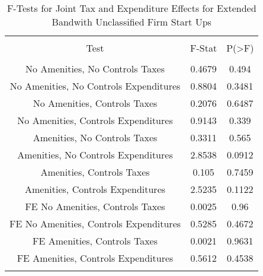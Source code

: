 
\begin{table}[!htbp] \centering 
  \caption{F-Tests for Joint Tax and Expenditure Effects for Extended Bandwith Unclassified Firm Start Ups} 
  \label{99Ftests} 
\begin{tabular}{@{\extracolsep{5pt}} ccc} 
\\[-1.8ex]\hline 
\hline \\[-1.8ex] 
Test & F-Stat & P(\textgreater F) \\ 
\hline \\[-1.8ex] 
No Amenities, No Controls Taxes & 0.4679 & 0.494 \\ 
No Amenities, No Controls Expenditures & 0.8804 & 0.3481 \\ 
No Amenities, Controls Taxes & 0.2076 & 0.6487 \\ 
No Amenities, Controls Expenditures & 0.9143 & 0.339 \\ 
Amenities, No Controls Taxes & 0.3311 & 0.565 \\ 
Amenities, No Controls Expenditures & 2.8538 & 0.0912 \\ 
Amenities, Controls Taxes & 0.105 & 0.7459 \\ 
Amenities, Controls Expenditures & 2.5235 & 0.1122 \\ 
FE No Amenities, Controls Taxes & 0.0025 & 0.96 \\ 
FE No Amenities, Controls Expenditures & 0.5285 & 0.4672 \\ 
FE Amenities, Controls Taxes & 0.0021 & 0.9631 \\ 
FE Amenities, Controls Expenditures & 0.5612 & 0.4538 \\ 
\hline \\[-1.8ex] 
\end{tabular} 
\end{table} 
